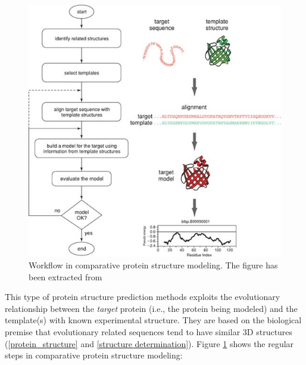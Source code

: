 \documentclass[11pt, b5paper,twoside]{tesi_upf}
\begin{document}
\begin{figure}[htbp]

  \centering
  	\includegraphics[scale=1]{../figures/workflow.jpg} %

	\caption [Workflow in comparative protein structure modeling]{Workflow in comparative protein structure modeling.  The figure has been extracted from \cite{Eswar2007}}
	\label{fig:workflow_modeling}
\end{figure}
\par This type of protein structure prediction methods exploits the evolutionary relationship between the \textit{target} protein (i.e., the protein being modeled) and the template(s) with known experimental structure. They are based on the biological premise that evolutionary related sequences tend to have similar 3D structures (\cref{protein_structure} and \ref{structure determination}). Figure \ref{fig:workflow_modeling} shows the regular steps in comparative protein structure modeling: 
\end{document}
